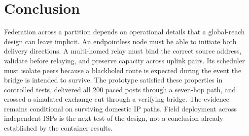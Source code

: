 \documentclass[conference,a4paper]{IEEEtran}
\begin{document}
\section{Conclusion}

Federation across a partition depends on operational details that a global-reach design can leave
implicit. An endpointless node must be able to initiate both delivery directions. A multi-homed
relay must bind the correct source address, validate before relaying, and preserve capacity across
uplink pairs. Its scheduler must isolate peers because a blackholed route is expected during the
event the bridge is intended to survive. The prototype satisfied these properties in controlled
tests, delivered all 200 paced posts through a seven-hop path, and crossed a simulated exchange cut
through a verifying bridge. The evidence remains conditional on surviving domestic IP paths. Field
deployment across independent ISPs is the next test of the design, not a conclusion already
established by the container results.
\end{document}
